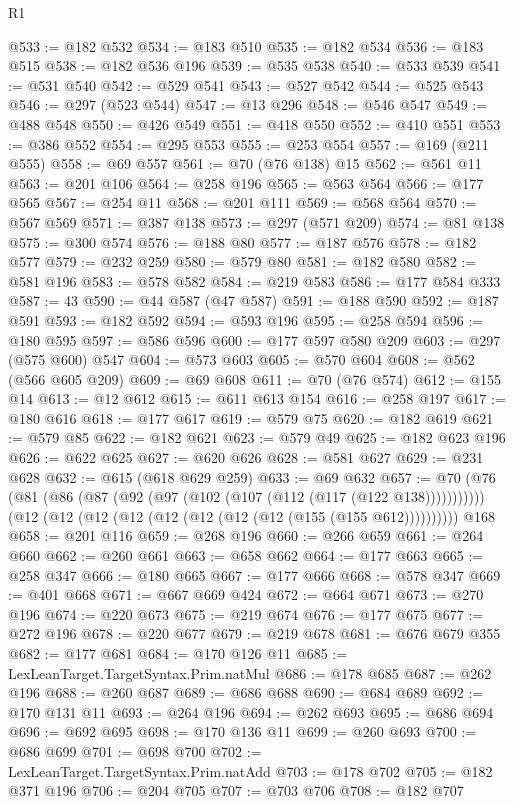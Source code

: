 \begin{lexlean}{R1}
\begin{coremodule}
@533 := @182 @532
@534 := @183 @510
@535 := @182 @534
@536 := @183 @515
@538 := @182 @536 @196
@539 := @535 @538
@540 := @533 @539
@541 := @531 @540
@542 := @529 @541
@543 := @527 @542
@544 := @525 @543
@546 := @297 (@523 @544)
@547 := @13 @296
@548 := @546 @547
@549 := @488 @548
@550 := @426 @549
@551 := @418 @550
@552 := @410 @551
@553 := @386 @552
@554 := @295 @553
@555 := @253 @554
@557 := @169 (@211 @555)
@558 := @69 @557
@561 := @70 (@76 @138) @15
@562 := @561 @11
@563 := @201 @106
@564 := @258 @196
@565 := @563 @564
@566 := @177 @565
@567 := @254 @11
@568 := @201 @111
@569 := @568 @564
@570 := @567 @569
@571 := @387 @138
@573 := @297 (@571 @209)
@574 := @81 @138
@575 := @300 @574
@576 := @188 @80
@577 := @187 @576
@578 := @182 @577
@579 := @232 @259
@580 := @579 @80
@581 := @182 @580
@582 := @581 @196
@583 := @578 @582
@584 := @219 @583
@586 := @177 @584 @333
@587 := 43
@590 := @44 @587 (@47 @587)
@591 := @188 @590
@592 := @187 @591
@593 := @182 @592
@594 := @593 @196
@595 := @258 @594
@596 := @180 @595
@597 := @586 @596
@600 := @177 @597 @580 @209
@603 := @297 (@575 @600) @547
@604 := @573 @603
@605 := @570 @604
@608 := @562 (@566 @605 @209)
@609 := @69 @608
@611 := @70 (@76 @574)
@612 := @155 @14
@613 := @12 @612
@615 := @611 @613 @154
@616 := @258 @197
@617 := @180 @616
@618 := @177 @617
@619 := @579 @75
@620 := @182 @619
@621 := @579 @85
@622 := @182 @621
@623 := @579 @49
@625 := @182 @623 @196
@626 := @622 @625
@627 := @620 @626
@628 := @581 @627
@629 := @231 @628
@632 := @615 (@618 @629 @259)
@633 := @69 @632
@657 := @70
    (@76 (@81 (@86 (@87 (@92 (@97 (@102 (@107 (@112 (@117 (@122 @138)))))))))))
    (@12 (@12 (@12 (@12 (@12 (@12 (@12 (@12 (@155 (@155 @612))))))))))
    @168
@658 := @201 @116
@659 := @268 @196
@660 := @266 @659
@661 := @264 @660
@662 := @260 @661
@663 := @658 @662
@664 := @177 @663
@665 := @258 @347
@666 := @180 @665
@667 := @177 @666
@668 := @578 @347
@669 := @401 @668
@671 := @667 @669 @424
@672 := @664 @671
@673 := @270 @196
@674 := @220 @673
@675 := @219 @674
@676 := @177 @675
@677 := @272 @196
@678 := @220 @677
@679 := @219 @678
@681 := @676 @679 @355
@682 := @177 @681
@684 := @170 @126 @11
@685 := LexLeanTarget.TargetSyntax.Prim.natMul
@686 := @178 @685
@687 := @262 @196
@688 := @260 @687
@689 := @686 @688
@690 := @684 @689
@692 := @170 @131 @11
@693 := @264 @196
@694 := @262 @693
@695 := @686 @694
@696 := @692 @695
@698 := @170 @136 @11
@699 := @260 @693
@700 := @686 @699
@701 := @698 @700
@702 := LexLeanTarget.TargetSyntax.Prim.natAdd
@703 := @178 @702
@705 := @182 @371 @196
@706 := @204 @705
@707 := @703 @706
@708 := @182 @707

\end{coremodule}
\end{lexlean}
